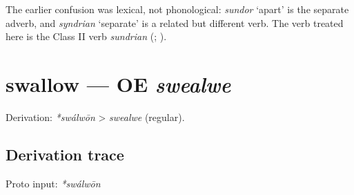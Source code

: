 \documentclass[
  british,
  a4paper,
  openany]{book}
\providecommand{\texorpdfstring}[2]{#1}
\begin{document}
The earlier confusion was lexical, not phonological: {\emph{sundor}}
`apart' is the separate adverb, and {\emph{syndrian}} `separate' is a
related but different verb. The verb treated here is the Class II verb
\emph{sundrian} (;
).

\section{\texorpdfstring{swallow --- OE
\emph{swealwe}}{swallow --- OE swealwe}}\label{swallow-oe-swealwe}


Derivation: \emph{*swálwōn} \textgreater{} \emph{swealwe} (regular).

\subsection{Derivation trace}\label{derivation-trace-53}

Proto input: \emph{*swálwōn}

\begingroup
\setlength{\fboxsep}{6pt}
\end{document}
